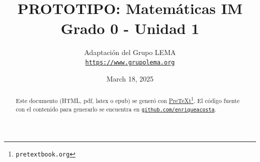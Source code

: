 
\title{PROTOTIPO: Matemáticas IM\textsuperscript{\textregistered}\\
{\large Grado 0 - Unidad 1}}
\author{Adaptación del Grupo LEMA\\
\href{https://www.grupolema.org}{\nolinkurl{https://www.grupolema.org}}
}
\date{March 18, 2025}

\raggedbottom
\label{gra0-uni1}\hypertarget{gra0-uni1}{}
\maketitle
\thispagestyle{empty}
\renewcommand*{\abstractname}{}
\begin{abstract}
Este documento (HTML, pdf, latex o epub) se generó con \href{https://pretextbook.org}{PreTeXt}\footnote{\nolinkurl{pretextbook.org}\label{meta-source-2-2}}. El código fuente con el contenido para generarlo se encuentra en \href{https://github.com/enriqueacosta/IllustrativeMath-GrupoLEMA}{\nolinkurl{github.com/enriqueacosta}}.%
\end{abstract}
\clearpage
\renewcommand*{\abstractname}{Licencia}
